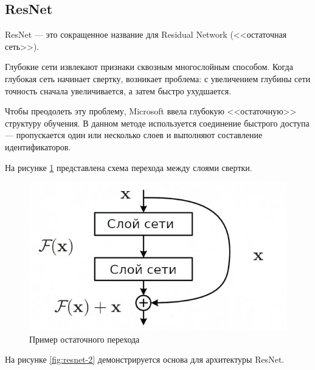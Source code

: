 \subsection{ResNet}

ResNet \cite{resnet} --- это сокращенное название для Residual Network (<<остаточная сеть>>).

Глубокие сети извлекают признаки сквозным многослойным способом. Когда глубокая сеть начинает свертку, возникает проблема: с увеличением глубины сети точность сначала увеличивается, а затем быстро ухудшается.

Чтобы преодолеть эту проблему, Microsoft ввела глубокую <<остаточную>> структуру обучения. В данном методе используется соединение быстрого доступа --- пропускается один или несколько слоев и выполняют составление идентификаторов.

На рисунке \ref{img:resnet-rus} представлена схема перехода между слоями свертки.

\begin{figure}[ht!]
	\centering
	\includegraphics[width=0.4\linewidth]{assets/resnet-rus.jpeg}
	\caption{Пример остаточного перехода}
	\label{img:resnet-rus}
\end{figure}

\newpage

На рисунке \ref{fig:resnet-2} демонстрируется основа для архитектуры ResNet.

